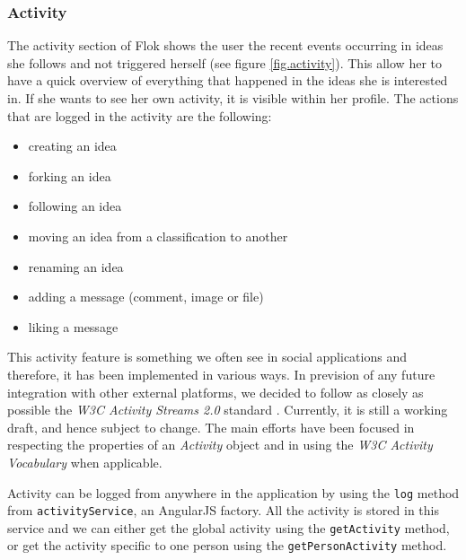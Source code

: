 \documentclass[a4paper,12pt, oneside]{article}
\begin{document}

\subsubsection{Activity}
The activity section of Flok shows the user the recent events occurring in ideas she follows and not triggered herself (see figure \ref{fig.activity}).
This allow her to have a quick overview of everything that happened in the ideas she is interested in.
If she wants to see her own activity, it is visible within her profile.
The actions that are logged in the activity are the following:
\begin{multicols}{2}
    \begin{itemize}
        \item creating an idea
        \item forking an idea
        \item following an idea
        \item moving an idea from a classification to another
        \item renaming an idea
        \item adding a message (comment, image or file)
        \item liking a message
    \end{itemize}
\end{multicols}

This activity feature is something we often see in social applications and therefore, it has been implemented in various ways.
In prevision of any future integration with other external platforms, we decided to follow as closely as possible the \emph{W3C Activity Streams 2.0} standard \cite{snell2015AS2}.
Currently, it is still a working draft, and hence subject to change.
The main efforts have been focused in respecting the properties of an \emph{Activity} object and in using the \emph{W3C Activity Vocabulary} \cite{snell2015AV} when applicable.

Activity can be logged from anywhere in the application by using the \texttt{log} method from \texttt{activityService}, an AngularJS factory.
All the activity is stored in this service and we can either get the global activity using the \texttt{getActivity} method, or get the activity specific to one person using the \texttt{getPersonActivity} method.
\end{document}
